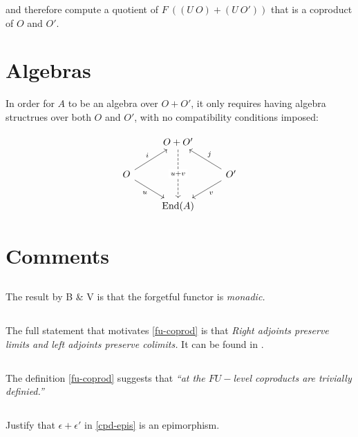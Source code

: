 \documentclass{amsart}
\begin{document}
and therefore compute a quotient of $F \ \left( (U \ O) + (U \ O')
\right)$ that is a coproduct of $O$ and $O'$.

\section{Algebras}


In order for $A$ to be an algebra over $O + O'$, it only requires having
algebra structrues over both $O$ and $O'$, with no compatibility conditions
imposed:

\begin{equation}\label{opd-cpd}
		\begin{tikzcd}
			& O + O' \arrow[dd, dashed, "u + v" description] &
					\\
			O \arrow[rd, "u"'] \arrow[ru, "i"] & & O'
				\arrow[ld, "v"] \arrow[lu, "j"'] \\
			& \mathrm{End}(A) &
		\end{tikzcd}
\end{equation}

\section{Comments}

\subsection{} The result by B \& V is that the forgetful functor is
\emph{monadic.}

\subsection{} The full statement that motivates \eqref{fu-coprod} is that
\emph{Right adjoints preserve limits and left adjoints preserve colimits.}
It can be found in \cite{riehl-ctic}.

\subsection{} The definition \eqref{fu-coprod} suggests that
\emph{``at the $FU-$level coproducts are trivially definied.''}

\subsection{} Justify that $\epsilon + \epsilon'$ in \eqref{cpd-epis} is
an epimorphism.
\end{document}
